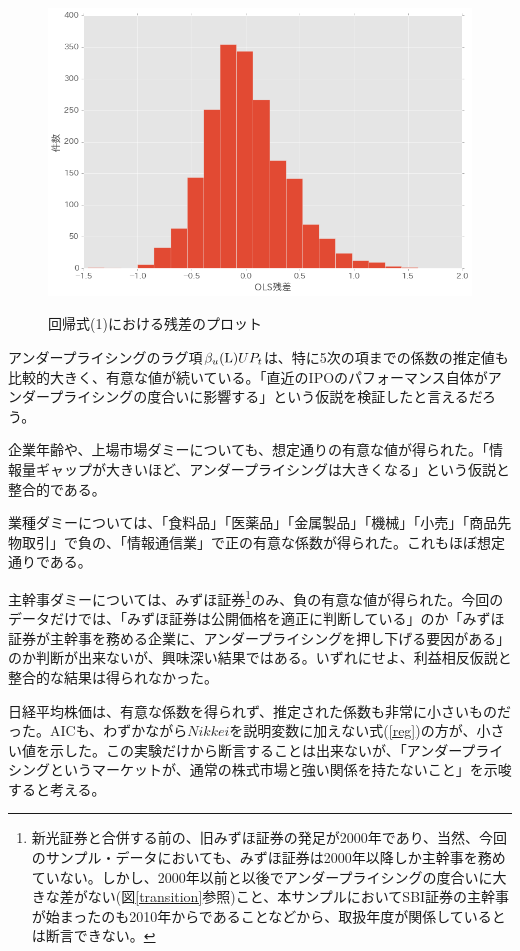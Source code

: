 \documentclass{jsarticle}
\begin{document}
\begin{figure}[!t]
  \begin{center}
  \caption{回帰式(1)における残差のプロット}
    \includegraphics[clip,width=14cm]{./residual.png}
    \label{residual}
  \end{center}
\end{figure}
\par
アンダープライシングのラグ項$\beta_u({\rm L})UP_t$は、特に5次の項までの係数の推定値も比較的大きく、有意な値が続いている。「直近のIPOのパフォーマンス自体がアンダープライシングの度合いに影響する」という仮説を検証したと言えるだろう。\par
企業年齢や、上場市場ダミーについても、想定通りの有意な値が得られた。「情報量ギャップが大きいほど、アンダープライシングは大きくなる」という仮説と整合的である。\par
業種ダミーについては、「食料品」「医薬品」「金属製品」「機械」「小売」「商品先物取引」で負の、「情報通信業」で正の有意な係数が得られた。これもほぼ想定通りである。\\ \par
主幹事ダミーについては、みずほ証券\footnote[18]{新光証券と合併する前の、旧みずほ証券の発足が2000年であり、当然、今回のサンプル・データにおいても、みずほ証券は2000年以降しか主幹事を務めていない。しかし、2000年以前と以後でアンダープライシングの度合いに大きな差がない(図\ref{transition}参照)こと、本サンプルにおいてSBI証券の主幹事が始まったのも2010年からであることなどから、取扱年度が関係しているとは断言できない。}のみ、負の有意な値が得られた。今回のデータだけでは、「みずほ証券は公開価格を適正に判断している」のか「みずほ証券が主幹事を務める企業に、アンダープライシングを押し下げる要因がある」のか判断が出来ないが、興味深い結果ではある。いずれにせよ、利益相反仮説と整合的な結果は得られなかった。\par
日経平均株価は、有意な係数を得られず、推定された係数も非常に小さいものだった。AICも、わずかながら$Nikkei$を説明変数に加えない式(\ref{reg})の方が、小さい値を示した。この実験だけから断言することは出来ないが、「アンダープライシングというマーケットが、通常の株式市場と強い関係を持たないこと」を示唆すると考える。\par
\end{document}
